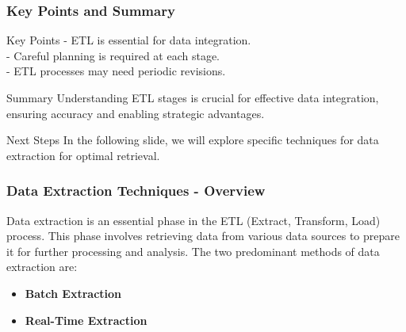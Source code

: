 \documentclass[aspectratio=169]{beamer}
\begin{document}
\begin{frame}[fragile]
    \frametitle{Key Points and Summary}
    \begin{block}{Key Points}
        - ETL is essential for data integration.\\
        - Careful planning is required at each stage.\\
        - ETL processes may need periodic revisions.
    \end{block}
    \begin{block}{Summary}
        Understanding ETL stages is crucial for effective data integration, ensuring accuracy and enabling strategic advantages.
    \end{block}
    \begin{block}{Next Steps}
        In the following slide, we will explore specific techniques for data extraction for optimal retrieval.
    \end{block}
\end{frame}

\begin{frame}[fragile]
    \frametitle{Data Extraction Techniques - Overview}
    Data extraction is an essential phase in the ETL (Extract, Transform, Load) process. This phase involves retrieving data from various data sources to prepare it for further processing and analysis. The two predominant methods of data extraction are:
    \begin{itemize}
        \item \textbf{Batch Extraction}
        \item \textbf{Real-Time Extraction}
    \end{itemize}
\end{frame}
\end{document}
